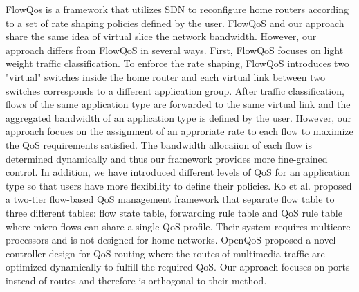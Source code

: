 FlowQos is a framework that utilizes SDN to reconfigure home routers according to a set of rate shaping
policies defined by the user. FlowQoS and our approach share the same idea of virtual slice the network bandwidth. However,
our approach differs from FlowQoS in several ways. First, FlowQoS focuses on light weight traffic classification. To enforce
the rate shaping, FlowQoS introduces two "virtual" switches inside the home router and each virtual link between two switches 
corresponds to a different application group. After traffic classification, flows of the same application type are forwarded to
the same virtual link and the aggregated bandwidth of an application type is defined by the user. However, our approach focues
on the assignment of an approriate rate to each flow to maximize the QoS requirements satisfied. The bandwidth allocaiion of each
flow is determined dynamically and thus our framework provides more fine-grained control. In addition, we have introduced different
levels of QoS for an application type so that users have more flexibility to define their policies. Ko et al. proposed a two-tier
flow-based QoS management framework that separate flow table to three different tables: flow state table, forwarding
rule table and QoS rule table where micro-flows can share a single QoS profile. Their system requires multicore processors and is
not designed for home networks. OpenQoS proposed a novel controller design for QoS routing where the routes of
multimedia traffic are optimized dynamically to fulfill the required QoS. Our approach focuses on ports instead of routes and therefore
is orthogonal to their method.
